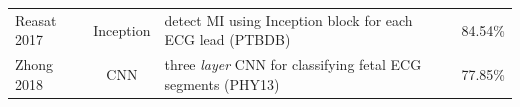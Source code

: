 \documentclass[journal]{IEEEtran}
\begin{document}
\begin{table}[!t]
\begin{minipage}{\textwidth}
\begin{tabularx}{\textwidth}{l c l l}
			Reasat 2017\cite{reasat2017detection}          & Inception      & detect MI using Inception block for each ECG lead (PTBDB)                                                  & 84.54\%                                                                                                                                                                                                                                                                                                                                                                                                                                                                                                                                                                                                                                                                                                                                                                                                                                                                                                  \\
			Zhong 2018\cite{zhong2018deep}                 & CNN            & three \textit{layer} CNN for classifying fetal ECG segments (PHY13)                                        & 77.85\%                                                                                                                                                                                                                                                                                                                                                                                                                                                                                                                                                                                                                                                                                                                                                                                                                                                                                                  \\
			\midrule

\end{tabularx}
\end{minipage}
\end{table}
\end{document}
